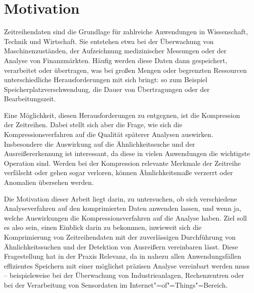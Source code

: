 \section{Motivation}

Zeitreihendaten sind die Grundlage für zahlreiche Anwendungen in Wissenschaft, Technik und Wirtschaft. Sie entstehen etwa bei der Überwachung von Maschinenzuständen, der Aufzeichnung medizinischer Messungen oder der Analyse von Finanzmärkten. Häufig werden diese Daten dann gespeichert, verarbeitet oder übertragen, was bei großen Mengen oder begrenzten Ressourcen unterschiedliche Herausforderungen mit sich bringt: so zum Beispiel Speicherplatzverschwendung, die Dauer von Übertragungen oder der Bearbeitungszeit.

Eine Möglichkeit, diesen Herausforderungen zu entgegnen, ist die Kompression der Zeitreihen. Dabei stellt sich aber die Frage, wie sich die Kompressionsverfahren auf die Qualität späterer Analysen auswirken. Insbesondere die Auswirkung auf die Ähnlichkeitssuche und der Ausreißererkennung ist interessant, da diese in vielen Anwendungen die wichtigste Operation sind. Werden bei der Kompression relevante Merkmale der Zeitreihe verfälscht oder gehen sogar verloren, können Ähnlichkeitsmaße verzerrt oder Anomalien übersehen werden.

Die Motivation dieser Arbeit liegt darin, zu untersuchen, ob sich verschiedene Analyseverfahren auf den komprimierten Daten anwenden lassen, und wenn ja, welche Auswirkungen die Kompressionsverfahren auf die Analyse haben. Ziel soll es also sein, einen Einblick darin zu bekommen, inwieweit sich die Komprimierung von Zeitreihendaten mit der zuverlässigen Durchführung von Ähnlichkeitssuchen und der Detektion von Ausreißern vereinbaren lässt. Diese Fragestellung hat in der Praxis Relevanz, da in nahezu allen Anwendungsfällen effizientes Speichern mit einer möglichst präzisen Analyse vereinbart werden muss -- beispielsweise bei der Überwachung von Industrieanlagen, Rechenzentren oder bei der Verarbeitung von Sensordaten im Internet"=of"=Things"=Bereich.